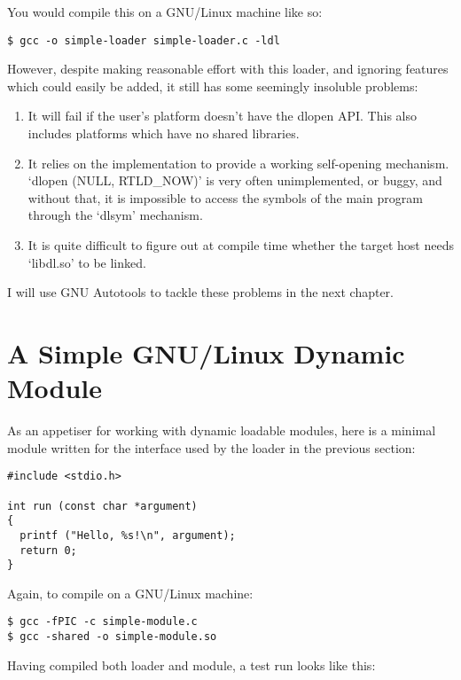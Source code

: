 You would compile this on a GNU/Linux machine like so:

\begin{Verbatim}[frame=single]
$ gcc -o simple-loader simple-loader.c -ldl
\end{Verbatim}

However, despite making reasonable effort with this loader, and ignoring features which could easily be added, it still has some seemingly insoluble problems:

\begin{enumerate}
   \item It will fail if the user's platform doesn't have the dlopen API. This also includes platforms which have no shared libraries.

   \item It relies on the implementation to provide a working self-opening mechanism. `dlopen (NULL, RTLD\_{}NOW)' is very often unimplemented, or buggy, and without that, it is impossible to access the symbols of the main program through the `dlsym' mechanism.

   \item It is quite difficult to figure out at compile time whether the target host needs `libdl.so' to be linked. 
\end{enumerate}

I will use GNU Autotools to tackle these problems in the next chapter. 

\section{A Simple GNU/Linux Dynamic Module}

As an appetiser for working with dynamic loadable modules, here is a minimal module written for the interface used by the loader in the previous section: 

\begin{Verbatim}[frame=single]
#include <stdio.h>

int run (const char *argument)
{
  printf ("Hello, %s!\n", argument);
  return 0;
}
\end{Verbatim}

Again, to compile on a GNU/Linux machine:

\begin{Verbatim}[frame=single]
$ gcc -fPIC -c simple-module.c
$ gcc -shared -o simple-module.so
\end{Verbatim}

Having compiled both loader and module, a test run looks like this:

